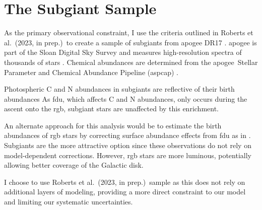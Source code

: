 \documentclass[12pt,oneside,letterpaper]{report}
\newcommand{\apogee}{\gls{apogee}}
\newcommand{\citetjack}{Roberts et al.~(2023, in prep.)}
\begin{document}
\chapter{The Subgiant Sample}\label{sec:jack}

As the primary observational constraint, I use the criteria outlined in \citetjack~to create a sample of \glspl{subgiant} from \apogee{} DR17 \citep{apogee17}. \Gls{apogee} is part of the Sloan Digital Sky Survey and measures high-resolution spectra of thousands of stars \cite{sdss17}. Chemical abundances are determined from the \apogee\ Stellar Parameter and Chemical Abundance Pipeline ({\sc aspcap}) \citep{aspcap}.  


Photospheric C and N abundances in \glspl{subgiant} are reflective of their birth abundances \citep{gilroy89, korn+07, lind+08, souto+18, souto19} As \gls{fdu}, which affects C and N abundances, only occurs during the ascent onto the \gls{rgb}, \gls{subgiant} stars are unaffected by this enrichment. 

An alternate approach for this analysis would be to estimate the birth abundances of \gls{rgb} stars by correcting surface abundance effects from \gls{fdu} as in \cite{vincenzo+21}. Subgiants are the more attractive option since these observations do not rely on model-dependent corrections. However, \gls{rgb} stars are more luminous, potentially allowing better coverage of the Galactic disk.


I choose to use \citetjack\ sample as this does not rely on additional layers of modeling, providing a more direct constraint to our model and limiting our systematic uncertainties.
\end{document}

